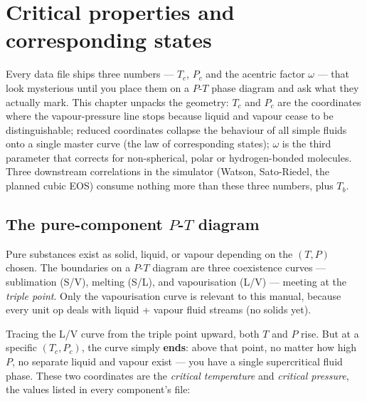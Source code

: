 \documentclass[11pt,a4paper]{article}
\begin{document}
\setcounter{section}{0}

\section{Critical properties and corresponding states}\label{ch:criticals}

\begin{whatyoulllearn}
Every data file ships three numbers --- $T_c$, $P_c$ and the
acentric factor $\omega$ --- that look mysterious until you place
them on a $P$-$T$ phase diagram and ask what they actually mark.
This chapter unpacks the geometry: $T_c$ and $P_c$ are the
coordinates where the vapour-pressure line stops because liquid and
vapour cease to be distinguishable; reduced coordinates collapse the
behaviour of all simple fluids onto a single master curve (the law of
corresponding states); $\omega$ is the third parameter that
corrects for non-spherical, polar or hydrogen-bonded molecules.
Three downstream correlations in the simulator (Watson, Sato-Riedel,
the planned cubic EOS) consume nothing more than these three
numbers, plus $T_b$.
\end{whatyoulllearn}

\subsection{The pure-component $P$-$T$ diagram}

Pure substances exist as solid, liquid, or vapour depending on the
$(T, P)$ chosen.  The boundaries on a $P$-$T$ diagram are three
coexistence curves --- sublimation (S/V), melting (S/L), and
vapourisation (L/V) --- meeting at the \emph{triple point}.  Only
the vapourisation curve is relevant to this manual, because every
unit op  deals with liquid + vapour fluid streams (no
solids yet).

Tracing the L/V curve from the triple point upward, both $T$ and
$P$ rise.  But at a specific $(T_c, P_c)$, the curve simply
\textbf{ends}: above that point, no matter how high $P$, no separate
liquid and vapour exist --- you have a single supercritical fluid
phase.  These two coordinates are the \emph{critical temperature}
and \emph{critical pressure}, the values listed in every component's
 file:
\end{document}
